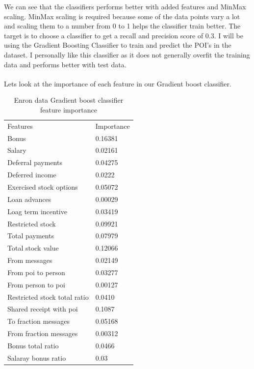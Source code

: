 \documentclass[12pt]{article}%
\begin{document}
\begin{figure}[!htbp]
\centering
\end{figure}
\newpage
We can see that the classifiers performs better with added features and MinMax scaling. MinMax scaling is required because some of the data points vary a lot and scaling them to a number from 0 to 1 helps the classifier train better. The target is to choose a classifier to get a recall and precision score of 0.3. I will be using the Gradient Boosting Classifier to train and predict the POI's in the dataset. I personally like this classifier as it does not generally overfit the training data and performs better with test data.
\\
\\
Lets look at the importance of each feature in our Gradient boost classifier.
\begin{table}[!htb]
\centering
\caption{Enron data Gradient boost classifier feature importance}
\label{my-label}
\begin{tabular}{ll}
 Features & Importance \\
 Bonus & 0.16381 \\
 Salary & 0.02161 \\
 Deferral payments & 0.04275 \\
 Deferred income &  0.0222 \\
 Exercised stock options &  0.05072 \\
 Loan advances & 0.00029 \\
 Loag term incentive & 0.03419 \\
 Restricted stock & 0.09921\\
 Total payments & 0.07979 \\
 Total stock value & 0.12066 \\
 From messages & 0.02149 \\
 From poi to person & 0.03277 \\
 From person to poi &  0.00127 \\
 Restricted stock total ratio & 0.0410 \\
 Shared receipt with poi & 0.1087 \\
 To fraction messages & 0.05168 \\
 From fraction messages & 0.00312 \\
 Bonus total ratio & 0.0466 \\
 Salaray bonus ratio & 0.03 \\
 
\end{tabular}
\end{table}
\end{document}
